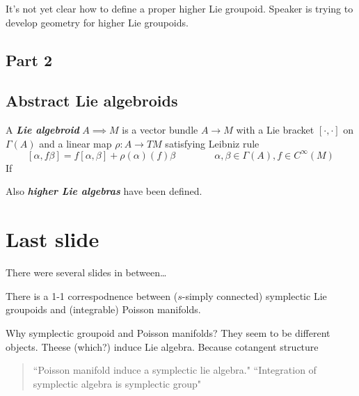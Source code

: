 \begin{remark}\leavevmode
It's not yet clear how to define a proper higher Lie groupoid. Speaker is trying to develop geometry for higher Lie groupoids.
\end{remark}

\subsection{Part 2}

\subsection{Abstract Lie algebroids}

\begin{defn}\leavevmode
	A \textit{\textbf{Lie algebroid}} \(A \implies  M\) is a vector bundle \(A \to M\) with a Lie bracket \([\cdot,\cdot]\) on \(\Gamma(A)\) and a linear map \(\rho:A \to TM\) satisfying Leibniz rule
	\[[\alpha,f \beta]=f[\alpha,\beta]+\rho(\alpha)(f)\beta\qquad \qquad \alpha, \beta \in \Gamma(A),f \in C^\infty(M)\]
If 	
\end{defn}

\begin{remark}\leavevmode
Also \textit{\textbf{higher Lie algebras}} have been defined.
\end{remark}

\section{Last slide}
There were several slides in between…

\begin{thm}\leavevmode
There is a 1-1 correspodnence between (\(s\)-simply connected) symplectic Lie groupoids and (integrable) Poisson manifolds.
\end{thm}

Why symplectic groupoid and Poisson manifolds? They seem to be different objects. Theese (which?) induce Lie algebra. Because cotangent structure 

\begin{quotation}
``Poisson manifold induce a symplectic lie algebra." ``Integration of symplectic algebra is symplectic group"
\end{quotation}




